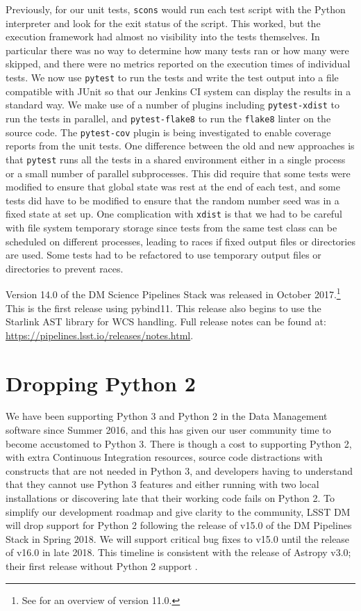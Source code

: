 \documentclass[11pt,twoside]{article}
\begin{document}
Previously, for our unit tests, \texttt{scons} would run each test script with the Python interpreter and look for the exit status of the script.
This worked, but the execution framework had almost no visibility into the tests themselves.
In particular there was no way to determine how many tests ran or how many were skipped, and there were no metrics reported on the execution times of individual tests.
We now use \texttt{pytest} to run the tests and write the test output into a file compatible with JUnit so that our Jenkins CI system can display the results in a standard way.
We make use of a number of plugins including \texttt{pytest-xdist} to run the tests in parallel, and \texttt{pytest-flake8} to run the \texttt{flake8} linter on the source code.
The \texttt{pytest-cov} plugin is being investigated to enable coverage reports from the unit tests.
One difference between the old and new approaches is that \texttt{pytest} runs all the tests in a shared environment either in a single process or a small number of parallel subprocesses.
This did require that some tests were modified to ensure that global state was rest at the end of each test, and some tests did have to be modified to ensure that the random number seed was in a fixed state at set up.
One complication with \texttt{xdist} is that we had to be careful with file system temporary storage since tests from the same test class can be scheduled on different processes, leading to races if fixed output files or directories are used.
Some tests had to be refactored to use temporary output files or directories to prevent races.

Version 14.0 of the DM Science Pipelines Stack was released in October 2017.\footnote{See \citet{P056_adassxxv} for an overview of version 11.0.}
This is the first release using pybind11.
This release also begins to use the Starlink AST library \citep{2016A&C....15...33B} for WCS handling.
Full release notes can be found at: \url{https://pipelines.lsst.io/releases/notes.html}.

\section{Dropping Python 2}

We have been supporting Python 3 and Python 2 in the Data Management software since Summer 2016, and this has given our user community time to become accustomed to Python 3.
There is though a cost to supporting Python 2, with extra Continuous Integration resources, source code distractions with constructs that are not needed in Python 3, and developers having to understand that they cannot use Python 3 features and either running with two local installations or discovering late that their working code fails on Python 2.
To simplify our development roadmap and give clarity to the community, LSST DM will drop support for Python 2 following the release of v15.0 of the DM  Pipelines Stack in Spring 2018.
We will support critical bug fixes to v15.0 until the release of v16.0 in late 2018. This timeline is consistent with the release of Astropy v3.0; their first release without Python 2 support \citep{APE10}.
\end{document}

